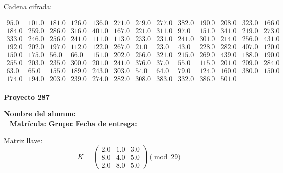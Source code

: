 \documentclass[12pt]{article}
\begin{document}
Cadena cifrada:
\begin{center}
$\begin{array}{lllllllllllll}
95.0 & 101.0 & 181.0 & 126.0 & 136.0 & 271.0 & 249.0 & 277.0 & 382.0 & 190.0 & 208.0 & 323.0 & 166.0\\
184.0 & 259.0 & 286.0 & 316.0 & 401.0 & 167.0 & 221.0 & 311.0 & 97.0 & 151.0 & 341.0 & 219.0 & 273.0\\
333.0 & 246.0 & 256.0 & 241.0 & 111.0 & 113.0 & 233.0 & 231.0 & 241.0 & 301.0 & 214.0 & 256.0 & 431.0\\
192.0 & 202.0 & 197.0 & 112.0 & 122.0 & 267.0 & 21.0 & 23.0 & 43.0 & 228.0 & 282.0 & 407.0 & 120.0\\
150.0 & 175.0 & 56.0 & 66.0 & 151.0 & 202.0 & 256.0 & 321.0 & 215.0 & 269.0 & 439.0 & 188.0 & 190.0\\
255.0 & 203.0 & 235.0 & 300.0 & 201.0 & 241.0 & 376.0 & 37.0 & 55.0 & 115.0 & 201.0 & 209.0 & 284.0\\
63.0 & 65.0 & 155.0 & 189.0 & 243.0 & 303.0 & 54.0 & 64.0 & 79.0 & 124.0 & 160.0 & 380.0 & 150.0\\
174.0 & 194.0 & 203.0 & 239.0 & 274.0 & 282.0 & 308.0 & 383.0 & 332.0 & 386.0 & 501.0\\
\end{array}$
\end{center}

\newpage


\textbf{Proyecto 287}

\textbf{Nombre del alumno:} \underline{\hspace{13cm}}\\\
\vspace{1cm}
\textbf{Matrícula:} \underline{\hspace{4cm}} \hspace{1cm}
\textbf{Grupo:} \underline{\hspace{2cm}}
\textbf{Fecha de entrega:} \underline{\hspace{2cm}}

\medskip

Matriz llave:
\[
K = \begin{pmatrix}
2.0 & 1.0 & 3.0\\
8.0 & 4.0 & 5.0\\
2.0 & 8.0 & 5.0
\end{pmatrix} \pmod{29}
\]
\end{document}
